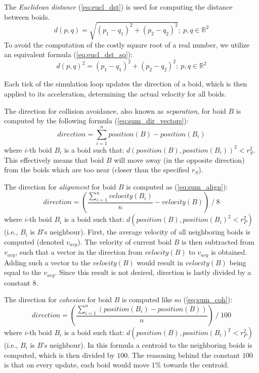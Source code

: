 \documentclass[9pt]{pnas-new}
\begin{document}
\noindent The {\em Euclidean distance} (\ref{eq:eucl_dst}) is used for computing the distance between boids.
\begin{equation} \label{eq:eucl_dst}
    d(p, q) = \sqrt{(p_1-q_1)^2 + (p_2 - q_2)^2};\  p, q \in \mathbb{R}^2
\end{equation}
To avoid the computation of the costly square root of a real number, we utilize an equivalent formula
(\ref{eq:eucl_dst_sq}):
\begin{equation} \label{eq:eucl_dst_sq}
    d(p, q)^2 = (p_1-q_1)^2 + (p_2 - q_2)^2;\  p, q \in \mathbb{R}^2
\end{equation}

Each tick of the simulation loop updates the direction of a boid, which is then applied to its acceleration,
determining the actual velocity for all boids.

The direction for collision avoidance, also known as {\em separation}, for boid $B$ is computed by the
following formula (\ref{eq:sum_dir_vectors}):
\begin{equation} \label{eq:sum_dir_vectors}
	direction = \sum_{i=1}^{n} position(B) - position(B_i)
\end{equation}
where $i$-th boid $B_i$ is a boid such that: $ d(position(B), position(B_i))^2 < r_S^2 $.
This effectively means that boid $B$ will move away (in the opposite direction) from the boids which are too near (closer than the specified $r_S$).

The direction for {\em alignment} for boid $B$ is computed as (\ref{eq:sum_align}):
\begin{equation} \label{eq:sum_align}
	direction = \left( \frac{\sum_{i=1}^{n} velocity(B_i)}{n} - velocity(B) \right) \mathbin{/} 8
\end{equation}
where $i$-th boid $B_i$ is a boid such that: $ d(position(B), position(B_i)^2 < r_P^2) $ (i.e., $B_i$ is $B$'s neighbour).
First, the average velocity of all neighboring boids is computed (denoted $v_{avg}$).
The velocity of current boid $B$ is then subtracted from $v_{avg}$, such that a vector in the direction
from $velocity(B)$ to $v_{avg}$ is obtained.
Adding such a vector to the $velocity(B)$ would result in $velocity(B)$ being equal to the $v_{avg}$.
Since this result is not desired, direction is lastly divided by a constant $8$.

The direction for {\em cohesion} for boid $B$ is computed like so (\ref{eq:sum_coh}):
\begin{equation} \label{eq:sum_coh}
	direction = \left( \frac{\sum_{i=1}^{n} \left(position(B_i) - position(B)\right)}{n} \right) \mathbin{/} 100
\end{equation}
where $i$-th boid $B_i$ is a boid such that: $ d(position(B), position(B_i)^2 < r_P^2) $ (i.e., $B_i$ is $B$'s neighbour).
In this formula a centroid to the neighboring boids is computed, which is then divided by $100$.
The reasoning behind the constant $100$ is that on every update, each boid would move $1\%$ towards the centroid.
\end{document}
